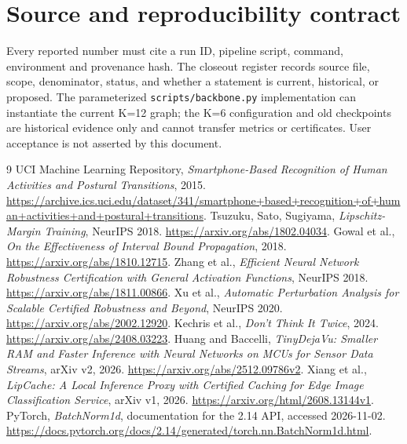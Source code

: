 \documentclass[11pt,a4paper]{article}
\begin{document}
\section{Source and reproducibility contract}
Every reported number must cite a run ID, pipeline script, command, environment
and provenance hash. The closeout register records source file, scope,
denominator, status, and whether a statement is current, historical, or
proposed. The parameterized \texttt{scripts/backbone.py} implementation can
instantiate the current K=12 graph; the K=6 configuration and old checkpoints
are historical evidence only and cannot transfer metrics or certificates. User
acceptance is not asserted by this document.
\clearpage
\begin{thebibliography}{9}
 UCI Machine Learning Repository, \emph{Smartphone-Based Recognition of Human Activities and Postural Transitions}, 2015. \url{https://archive.ics.uci.edu/dataset/341/smartphone+based+recognition+of+human+activities+and+postural+transitions}.
 Tsuzuku, Sato, Sugiyama, \emph{Lipschitz-Margin Training}, NeurIPS 2018. \url{https://arxiv.org/abs/1802.04034}.
 Gowal et al., \emph{On the Effectiveness of Interval Bound Propagation}, 2018. \url{https://arxiv.org/abs/1810.12715}.
 Zhang et al., \emph{Efficient Neural Network Robustness Certification with General Activation Functions}, NeurIPS 2018. \url{https://arxiv.org/abs/1811.00866}.
 Xu et al., \emph{Automatic Perturbation Analysis for Scalable Certified Robustness and Beyond}, NeurIPS 2020. \url{https://arxiv.org/abs/2002.12920}.
 Kechris et al., \emph{Don't Think It Twice}, 2024. \url{https://arxiv.org/abs/2408.03223}.
 Huang and Baccelli, \emph{TinyDejaVu: Smaller RAM and Faster Inference with Neural Networks on MCUs for Sensor Data Streams}, arXiv v2, 2026. \url{https://arxiv.org/abs/2512.09786v2}.
 Xiang et al., \emph{LipCache: A Local Inference Proxy with Certified Caching for Edge Image Classification Service}, arXiv v1, 2026. \url{https://arxiv.org/html/2608.13144v1}.
 PyTorch, \emph{BatchNorm1d}, documentation for the 2.14 API, accessed 2026-11-02. \url{https://docs.pytorch.org/docs/2.14/generated/torch.nn.BatchNorm1d.html}.
\end{thebibliography}
\end{document}
